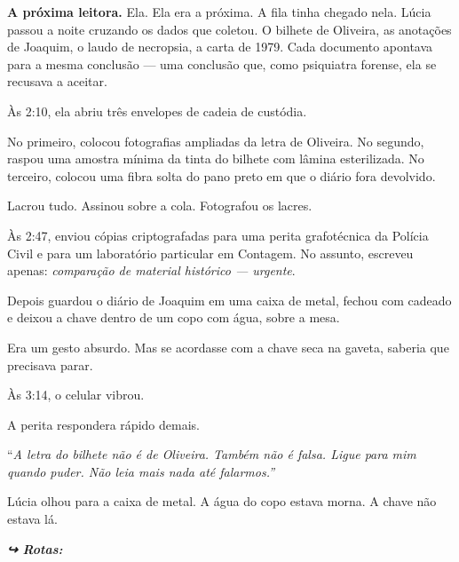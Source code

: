 \noindent \textbf{A próxima leitora.}
\noindent Ela.
\noindent Ela era a próxima.
\noindent A fila tinha chegado nela.
\noindent Lúcia passou a noite cruzando os dados que coletou. O bilhete de Oliveira, as anotações de Joaquim, o laudo de necropsia, a carta de 1979. Cada documento apontava para a mesma conclusão --- uma conclusão que, como psiquiatra forense, ela se recusava a aceitar.

\noindent Às 2:10, ela abriu três envelopes de cadeia de custódia.

\noindent No primeiro, colocou fotografias ampliadas da letra de Oliveira.
\noindent No segundo, raspou uma amostra mínima da tinta do bilhete com lâmina esterilizada.
\noindent No terceiro, colocou uma fibra solta do pano preto em que o diário fora devolvido.

\noindent Lacrou tudo. Assinou sobre a cola. Fotografou os lacres.

\noindent Às 2:47, enviou cópias criptografadas para uma perita grafotécnica da Polícia Civil e para um laboratório particular em Contagem. No assunto, escreveu apenas: \textit{comparação de material histórico --- urgente}.

\noindent Depois guardou o diário de Joaquim em uma caixa de metal, fechou com cadeado e deixou a chave dentro de um copo com água, sobre a mesa.

\noindent Era um gesto absurdo. Mas se acordasse com a chave seca na gaveta, saberia que precisava parar.

\noindent Às 3:14, o celular vibrou.

\noindent A perita respondera rápido demais.

\noindent \textquotedblleft{\textit{A letra do bilhete não é de Oliveira. Também não é falsa. Ligue para mim quando puder. Não leia mais nada até falarmos.\textquotedblright}}

\noindent Lúcia olhou para a caixa de metal. A água do copo estava morna. A chave não estava lá.

\vspace{0.5em}
\noindent\textit{\textbf{↪ Rotas:}  \rotasep {} \rotasep {}}

